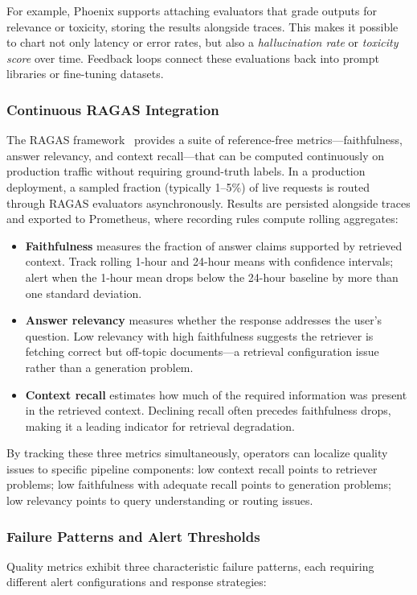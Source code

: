 For example, Phoenix \cite{arize_phoenix_docs} supports attaching evaluators that grade outputs for relevance or toxicity, storing the results alongside traces. This makes it possible to chart not only latency or error rates, but also a \emph{hallucination rate} or \emph{toxicity score} over time. Feedback loops connect these evaluations back into prompt libraries or fine-tuning datasets.

\subsubsection{Continuous RAGAS Integration}
The RAGAS framework~\cite{ragas_eacl2024} provides a suite of reference-free metrics---faithfulness, answer relevancy, and context recall---that can be computed continuously on production traffic without requiring ground-truth labels. In a production deployment, a sampled fraction (typically 1--5\%) of live requests is routed through RAGAS evaluators asynchronously. Results are persisted alongside traces and exported to Prometheus, where recording rules compute rolling aggregates:

\begin{itemize}
    \item \textbf{Faithfulness} measures the fraction of answer claims supported by retrieved context. Track rolling 1-hour and 24-hour means with confidence intervals; alert when the 1-hour mean drops below the 24-hour baseline by more than one standard deviation.
    \item \textbf{Answer relevancy} measures whether the response addresses the user's question. Low relevancy with high faithfulness suggests the retriever is fetching correct but off-topic documents---a retrieval configuration issue rather than a generation problem.
    \item \textbf{Context recall} estimates how much of the required information was present in the retrieved context. Declining recall often precedes faithfulness drops, making it a leading indicator for retrieval degradation.
\end{itemize}

By tracking these three metrics simultaneously, operators can localize quality issues to specific pipeline components: low context recall points to retriever problems; low faithfulness with adequate recall points to generation problems; low relevancy points to query understanding or routing issues.

\subsubsection{Failure Patterns and Alert Thresholds}
Quality metrics exhibit three characteristic failure patterns, each requiring different alert configurations and response strategies:

